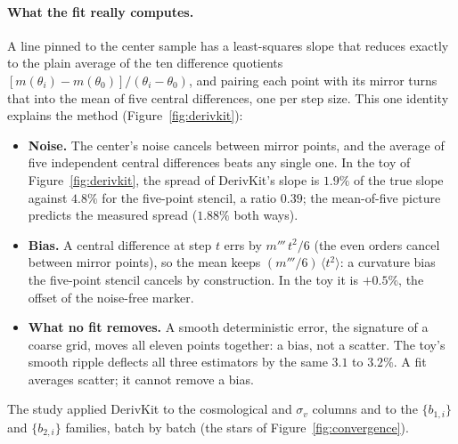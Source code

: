 \documentclass[11pt]{article}
\begin{document}
\paragraph{What the fit really computes.}
A line pinned to the center sample has a least-squares slope that
reduces exactly to the plain average of the ten difference quotients
$[m(\theta_i) - m(\theta_0)]/(\theta_i - \theta_0)$, and pairing each
point with its mirror turns that into the mean of five central
differences, one per step size.  This one identity explains the
method (Figure~\ref{fig:derivkit}):
\begin{itemize}
  \item \textbf{Noise.}  The center's noise cancels between mirror
    points, and the average of five independent central differences
    beats any single one.  In the toy of Figure~\ref{fig:derivkit},
    the spread of DerivKit's slope is $1.9\%$ of the true slope
    against $4.8\%$ for the five-point stencil, a ratio $0.39$; the
    mean-of-five picture predicts the measured spread ($1.88\%$ both
    ways).
  \item \textbf{Bias.}  A central difference at step $t$ errs by
    $m'''\,t^2/6$ (the even orders cancel between mirror points), so
    the mean keeps $(m'''/6)\,\langle t^2\rangle$: a curvature bias
    the five-point stencil cancels by construction.  In the toy it is
    $+0.5\%$, the offset of the noise-free marker.
  \item \textbf{What no fit removes.}  A smooth deterministic error,
    the signature of a coarse grid, moves all eleven points together:
    a bias, not a scatter.  The toy's smooth ripple deflects all three
    estimators by the same $3.1$ to $3.2\%$.  A fit averages scatter;
    it cannot remove a bias.
\end{itemize}
The study applied DerivKit to the cosmological and $\sigma_v$ columns
and to the $\{b_{1,i}\}$ and $\{b_{2,i}\}$ families, batch by batch
(the stars of Figure~\ref{fig:convergence}).
\end{document}
